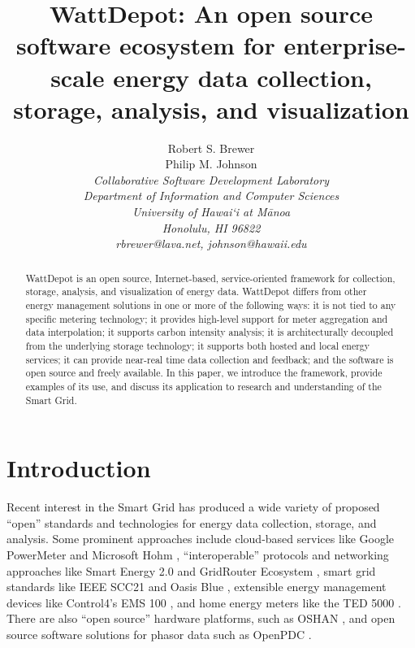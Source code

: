 \documentclass[conference]{IEEEtran}
\begin{document}
\title{WattDepot: An open source software ecosystem for enterprise-scale
  energy data collection, storage, analysis, and visualization}

\author{Robert S. Brewer\\
        Philip M. Johnson\\
\em     Collaborative Software Development Laboratory\\
        Department of Information and Computer Sciences\\
        University of Hawai`i at M\=anoa\\
        Honolulu, HI 96822\\
        rbrewer@lava.net, johnson@hawaii.edu\\
}


\maketitle

\begin{abstract}  %
  WattDepot is an open source, Internet-based, service-oriented framework 
  for collection, storage, analysis, and visualization of energy data.
  WattDepot differs from other energy management solutions in one or more
  of the following ways: it is not tied to any specific metering
  technology; it provides high-level support for meter aggregation and data
  interpolation; it supports carbon intensity analysis; it is
  architecturally decoupled from the underlying storage technology; it
  supports both hosted and local energy services; it can provide near-real
  time data collection and feedback; and the software is open source and
  freely available.  In this paper, we introduce the framework, provide
  examples of its use, and discuss its application to research and
  understanding of the Smart Grid.
\end{abstract}


\section{Introduction}
\label{sec:intro}

Recent interest in the Smart Grid has produced a wide variety of proposed
``open'' standards and technologies for energy data collection, storage,
and analysis.  Some prominent approaches include cloud-based services like
Google PowerMeter \cite{GooglePowerMeter} and Microsoft Hohm
\cite{MicrosoftHohm}, ``interoperable'' protocols and networking approaches
like Smart Energy 2.0 \cite{SmartEnergy2.0} and GridRouter Ecosystem
\cite{GridRouterEcosystem}, smart grid standards like IEEE SCC21
\cite{IEEESCC21} and Oasis Blue \cite{OasisBlue}, extensible energy
management devices like Control4's EMS 100 \cite{EMS100}, and home energy 
meters like the TED 5000 \cite{TED}.  There are also
``open source'' hardware platforms, such as OSHAN \cite{OSHAN}, and open
source software solutions for phasor data such as OpenPDC \cite{OpenPDC}.
\end{document}
